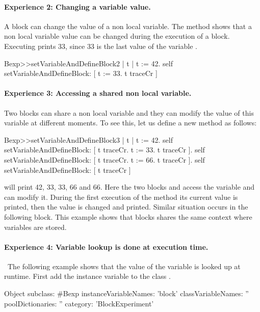 \documentclass[a4paper,10pt,twoside]{book}
\begin{document}
\paragraph{Experience 2: Changing a variable value.} A block can change the value of a non local variable.
The method  shows that a non local variable value can be changed during the execution of a block. Executing  prints 33, since 33 is the last value of the variable .


\begin{code}{}
Bexp>>setVariableAndDefineBlock2
	| t |
	t := 42.
	self setVariableAndDefineBlock: [ t := 33. t traceCr ]
\end{code}
\paragraph{Experience 3: Accessing a shared non local variable.}
Two blocks can share a non local variable and they can modify the value of this variable at different moments. To see this, let us define a new method  as follows:

\begin{code}{}
Bexp>>setVariableAndDefineBlock3
	| t |
	t := 42.
	self setVariableAndDefineBlock: [ t traceCr. t := 33. t traceCr ].
	self setVariableAndDefineBlock: [ t traceCr. t := 66. t traceCr ].
	self setVariableAndDefineBlock: [ t traceCr ]
\end{code}

 will print 42, 33, 33, 66 and 66.
Here the two blocks \ct{[ t := 33. t traceCr ]} and \ct{[ t := 66. t traceCr ]} access the variable  and can modify it. During the first execution of the method  its current value  is printed, then the value is changed and printed. Similar situation occurs in the following block. This example shows that blocks shares the same context where variables are stored.

\paragraph{Experience 4: Variable lookup is done at execution time.}\
The following example shows that the value of the variable is looked up at runtime.
First add the instance variable \ct{block} to the class \ct{Bexp}.

\begin{code}{}
Object subclass: #Bexp
	instanceVariableNames: 'block'
	classVariableNames: ''
	poolDictionaries: ''
	category: 'BlockExperiment'
\end{code}
\end{document}
